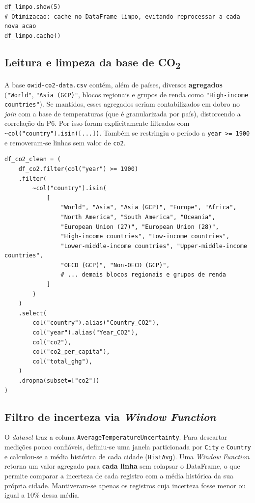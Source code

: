 \begin{lstlisting}[caption={Materialização em memória do DataFrame limpo.},label={lst:cache}]
df_limpo.show(5)
# Otimizacao: cache no DataFrame limpo, evitando reprocessar a cada nova acao
df_limpo.cache()
\end{lstlisting}

\subsection{Leitura e limpeza da base de CO\textsubscript{2}}

A base \texttt{owid-co2-data.csv} contém, além de países, diversos \textbf{agregados}
(\texttt{"World"}, \texttt{"Asia (GCP)"}, blocos regionais e grupos de renda como
\texttt{"High-income countries"}). Se mantidos, esses agregados seriam contabilizados em
dobro no \textit{join} com a base de temperaturas (que é granularizada por país),
distorcendo a correlação da P6. Por isso foram explicitamente filtrados com
\texttt{\textasciitilde col("country").isin([...])}. Também se restringiu o período a
\texttt{year >= 1900} e removeram-se linhas sem valor de \texttt{co2}.

\begin{lstlisting}[caption={Filtragem de agregados globais e seleção de colunas da base de CO2.},label={lst:co2}]
df_co2_clean = (
    df_co2.filter(col("year") >= 1900)
    .filter(
        ~col("country").isin(
            [
                "World", "Asia", "Asia (GCP)", "Europe", "Africa",
                "North America", "South America", "Oceania",
                "European Union (27)", "European Union (28)",
                "High-income countries", "Low-income countries",
                "Lower-middle-income countries", "Upper-middle-income countries",
                "OECD (GCP)", "Non-OECD (GCP)",
                # ... demais blocos regionais e grupos de renda
            ]
        )
    )
    .select(
        col("country").alias("Country_CO2"),
        col("year").alias("Year_CO2"),
        col("co2"),
        col("co2_per_capita"),
        col("total_ghg"),
    )
    .dropna(subset=["co2"])
)
\end{lstlisting}

\subsection{Filtro de incerteza via \textit{Window Function}}

O \textit{dataset} traz a coluna \texttt{AverageTemperatureUncertainty}. Para descartar
medições pouco confiáveis, definiu-se uma janela particionada por \texttt{City} e
\texttt{Country} e calculou-se a média histórica de cada cidade
(\texttt{HistAvg}). Uma \textit{Window Function} retorna um valor agregado para
\textbf{cada linha} sem colapsar o DataFrame, o que permite comparar a incerteza de cada
registro com a média histórica da sua própria cidade. Mantiveram-se apenas os registros
cuja incerteza fosse menor ou igual a 10\% dessa média.

